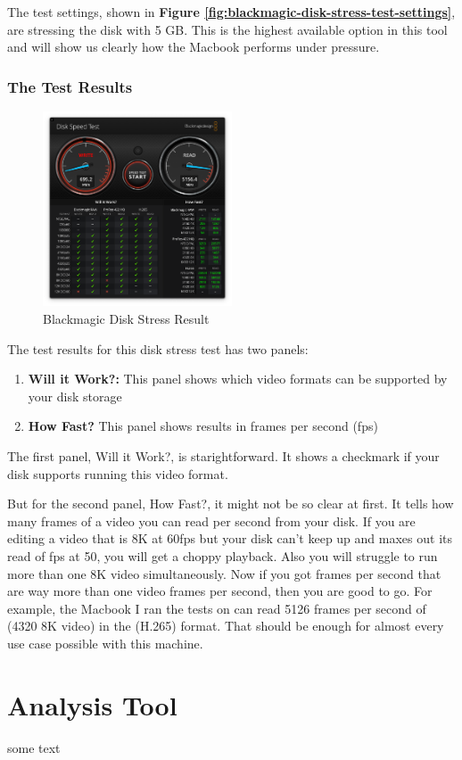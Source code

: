 \documentclass[a4paper]{article}
\begin{document}
The test settings, shown in \textbf{Figure \ref{fig:blackmagic-disk-stress-test-settings}}, are stressing the disk with 5 GB. This is the highest available option in this tool and will show us clearly how the Macbook performs under pressure.

\subsubsection{The Test Results}

\begin{figure}[h!]
    \centering
    \includegraphics[width=0.5\textwidth]{images/blackmagic-disk-stress-result.png}
    \caption{Blackmagic Disk Stress Result}
    \label{fig:blackmagic-disk-stress-test-result}
\end{figure}

The test results for this disk stress test has two panels:

\begin{enumerate}
    \item \textbf{Will it Work?:} This panel shows which video formats can be supported by your disk storage
    \item \textbf{How Fast?} This panel shows results in frames per second (fps)
\end{enumerate}

The first panel, Will it Work?, is starightforward. It shows a checkmark if your disk supports running this video format.

But for the second panel, How Fast?, it might not be so clear at first. It tells how many frames of a video you can read per second from your disk. If you are editing a video that is 8K at 60fps but your disk can't keep up and maxes out its read of fps at 50, you will get a choppy playback. Also you will struggle to run more than one 8K video simultaneously. Now if you got frames per second that are way more than one video frames per second, then you are good to go. For example, the Macbook I ran the tests on can read 5126 frames per second of (4320 8K video) in the (H.265) format. That should be enough for almost every use case possible with this machine.

\section{Analysis Tool}

some text
\end{document}
